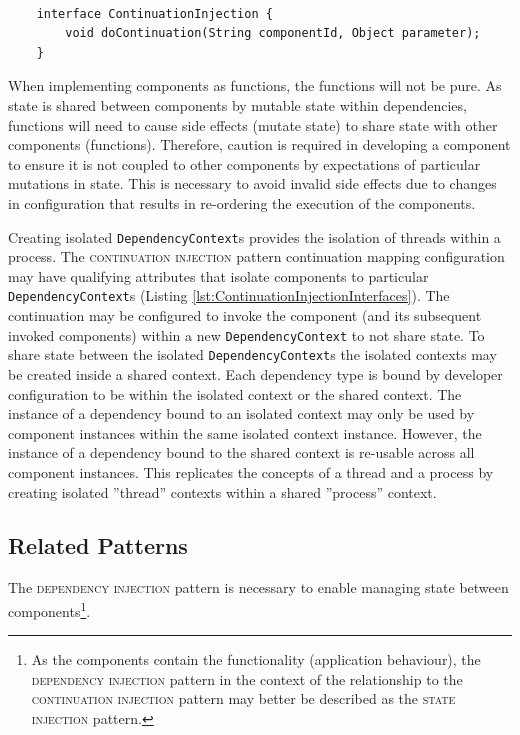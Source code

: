 \documentclass[prodmode]{style/acmlarge}
\begin{document}
\begin{lstlisting}[float,label=lst:ContinuationInjectionInterface]

    interface ContinuationInjection {
        void doContinuation(String componentId, Object parameter);
    }
\end{lstlisting}

When implementing components as functions, the functions will not be pure.  As
state is shared between components by mutable state within dependencies,
functions will need to cause side effects (mutate state) to share state with
other components (functions).  Therefore, caution is required in developing a
component to ensure it is not coupled to other components by expectations of
particular mutations in state.  This is necessary to avoid invalid side effects
due to changes in configuration that results in re-ordering the execution of the
components.

Creating isolated \texttt{DependencyContext}s provides the isolation of threads
within a process.  The \textsc{continuation injection} pattern continuation
mapping configuration may have qualifying attributes that isolate components to
particular \texttt{DependencyContext}s (Listing
\ref{lst:ContinuationInjectionInterfaces}).  The continuation may be configured
to invoke the component (and its subsequent invoked components) within a new
\texttt{DependencyContext} to not share state.  To share state between the
isolated \texttt{Depend\-ency\-Context}s the isolated contexts may be created
inside a shared context.  Each dependency type is bound by developer
configuration to be within the isolated context or the shared context.  The
instance of a dependency bound to an isolated context may only be used by
component instances within the same isolated context instance.
However, the instance of a dependency bound to the shared context is re-usable
across all component instances.  This replicates the concepts of a thread and a
process by creating isolated ''thread'' contexts within a shared ''process''
context.


\subsection{Related Patterns}

The \textsc{dependency injection} pattern \cite{ioc} is necessary to enable
managing state between components\footnote{As the components contain the
functionality (application behaviour), the \textsc{dependency injection} pattern
in the context of the relationship to the \textsc{continuation injection}
pattern may better be described as the \textsc{state injection} pattern.}.
\end{document}
